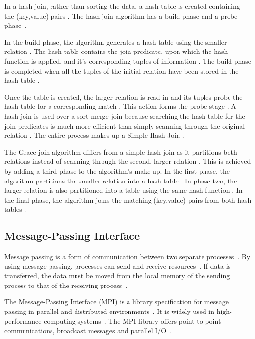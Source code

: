 \documentclass[12pt,twocolumn]{witseiepaper}
\begin{document}
In a hash join, rather than sorting the data, a hash table is created containing the (key,value) pairs \cite{thomas_zurek_optimisation_1997}. The hash join algorithm has a build phase and a probe phase~\cite{equijoin}. 

In the build phase, the algorithm generates a hash table using the smaller relation \cite{evaluating4JoinAlgorithms}. The hash table contains the join predicate, upon which the hash function is applied, and it's corresponding tuples of information \cite{thomas_zurek_optimisation_1997, evaluating4JoinAlgorithms}. The build phase is completed when all the tuples of the initial relation have been stored in the hash table \cite{thomas_zurek_optimisation_1997}. 

Once the table is created, the larger relation is read in and its tuples probe the hash table for a corresponding match \cite{thomas_zurek_optimisation_1997}. This action forms the probe stage \cite{evaluating4JoinAlgorithms}. A hash join is used over a sort-merge join because searching the hash table for the join predicates is much more efficient than simply scanning through the original relation \cite{evaluating4JoinAlgorithms}. The entire process makes up a Simple Hash Join \cite{evaluating4JoinAlgorithms}. 

The Grace join algorithm differs from a simple hash join as it partitions both relations instead of scanning through the second, larger relation \cite{graceHash}. This is achieved by adding a third phase to the algorithm's make up. In the first phase, the algorithm partitions the smaller relation into a hash table \cite{graceHash}. In phase two, the larger relation is also partitioned into a table using the same hash function \cite{evaluating4JoinAlgorithms}. In the final phase, the algorithm joins the matching (key,value) pairs from both hash tables \cite{evaluating4JoinAlgorithms}.

\subsection{Message-Passing Interface}
Message passing is a form of communication between two separate processes~\cite{IBM, equijoinWithMPI}. By using message passing, processes can send and receive resources~\cite{IBM}. If data is transferred, the data must be moved from the local memory of the sending process to that of the receiving process~\cite{IBM}.

The Message-Passing Interface (MPI) is a library specification for message passing in parallel and distributed environments~\cite{comparingMPIMapReduce}. It is widely used in high-performance computing systems~\cite{equijoinWithMPI, joinOnCluster}. The MPI library offers point-to-point communications, broadcast messages and parallel I/O~\cite{comparingMPIMapReduce}.
\end{document}
